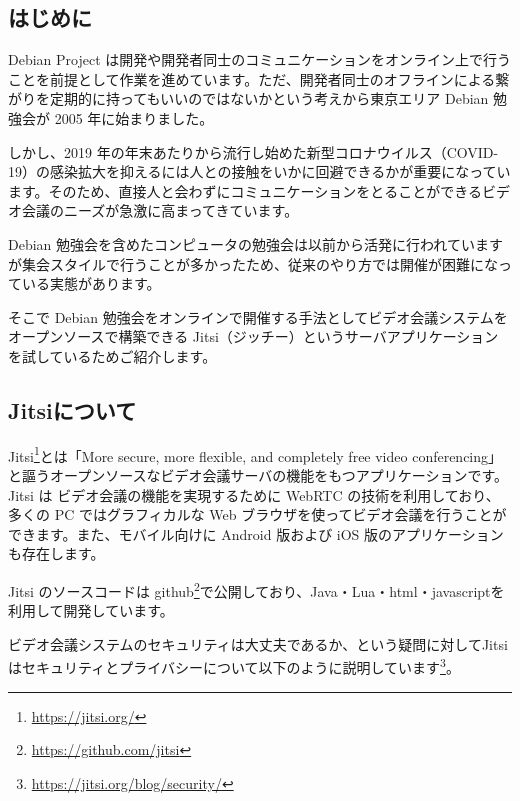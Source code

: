 \documentclass[mingoth,a4paper]{jsarticle}
\begin{document}


\subsection{はじめに}

Debian Project は開発や開発者同士のコミュニケーションをオンライン上で行うことを前提として作業を進めています。ただ、開発者同士のオフラインによる繋がりを定期的に持ってもいいのではないかという考えから東京エリア Debian 勉強会が 2005 年に始まりました。

しかし、2019 年の年末あたりから流行し始めた新型コロナウイルス（COVID-19）の感染拡大を抑えるには人との接触をいかに回避できるかが重要になっています。そのため、直接人と会わずにコミュニケーションをとることができるビデオ会議のニーズが急激に高まってきています。

Debian 勉強会を含めたコンピュータの勉強会は以前から活発に行われていますが集会スタイルで行うことが多かったため、従来のやり方では開催が困難になっている実態があります。

そこで Debian 勉強会をオンラインで開催する手法としてビデオ会議システムをオープンソースで構築できる Jitsi（ジッチー）というサーバアプリケーションを試しているためご紹介します。


\subsection{Jitsiについて}

Jitsi\footnote{\url{https://jitsi.org/}}とは「More secure, more flexible, and completely free video conferencing」と謳うオープンソースなビデオ会議サーバの機能をもつアプリケーションです。Jitsi は ビデオ会議の機能を実現するために WebRTC の技術を利用しており、多くの PC ではグラフィカルな Web ブラウザを使ってビデオ会議を行うことができます。また、モバイル向けに Android 版および iOS 版のアプリケーションも存在します。

Jitsi のソースコードは github\footnote{\url{https://github.com/jitsi}}で公開しており、Java・Lua・html・javascriptを利用して開発しています。

ビデオ会議システムのセキュリティは大丈夫であるか、という疑問に対してJitsiはセキュリティとプライバシーについて以下のように説明しています\footnote{\url{https://jitsi.org/blog/security/}}。
\end{document}
